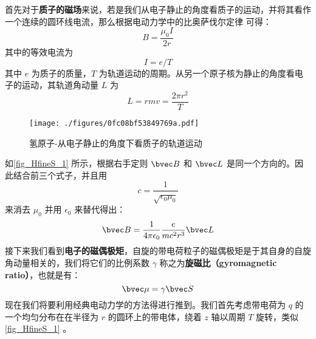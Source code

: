 首先对于\textbf{质子的磁场}来说，若是我们从电子静止的角度看质子的运动，并将其看作一个连续的圆环线电流，那么根据电动力学中的比奥萨伐尔定律 可得：
\begin{equation}
B=\frac{\mu_0I}{2r}
\end{equation}
其中的等效电流为
\begin{equation}
I=e/T
\end{equation}
其中 $e$ 为质子的质量，$T$ 为轨道运动的周期。从另一个原子核为静止的角度看电子的运动，其轨道角动量 $L$ 为
\begin{equation}
L=rmv=\frac{2\pi r^2}{T}
\end{equation}
\begin{figure}[ht]
\centering
\texttt{[image: ./figures/0fc08bf53849769a.pdf]}
\caption{氢原子-从电子静止的角度下看质子的轨道运动} \label{fig_HfineS_1}
\end{figure}
如\autoref{fig_HfineS_1} 所示，根据右手定则 $\bvec B$ 和 $\bvec L$ 是同一个方向的。因此结合前三个式子，并且用
\begin{equation}
c=\frac{1}{\sqrt{\epsilon_0\mu_0}}
\end{equation}
来消去 $\mu_0$ 并用 $\epsilon_0$ 来替代得出：
\begin{equation}\label{eq_HfineS_31}
\bvec B = \frac{1}{4\pi\epsilon_0}\frac{e}{mc^2r^3}\bvec L
\end{equation}
接下来我们看到\textbf{电子的磁偶极矩}，自旋的带电荷粒子的磁偶极矩是于其自身的自旋角动量相关的，我们将它们的比例系数 $\gamma$ 称之为\textbf{旋磁比（gyromagnetic
ratio）}，也就是有：
\begin{equation}
\bvec\mu=\gamma\bvec S
\end{equation}
现在我们将要利用经典电动力学的方法得进行推到。我们首先考虑带电荷为 $q$ 的一个均匀分布在在半径为 $r$ 的圆环上的带电体，绕着 $z$ 轴以周期 $T$ 旋转，类似\autoref{fig_HfineS_1} 。

